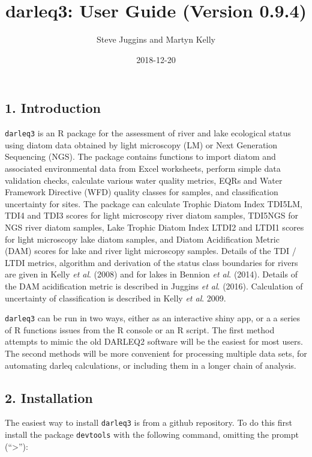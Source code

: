 \documentclass[]{article}
\title{darleq3: User Guide (Version 0.9.4)}
\author{Steve Juggins and Martyn Kelly}
\date{2018-12-20}
\begin{document}
\maketitle

\hypertarget{introduction}{%
\subsection{1. Introduction}\label{introduction}}

\texttt{darleq3} is an R package for the assessment of river and lake
ecological status using diatom data obtained by light microscopy (LM) or
Next Generation Sequencing (NGS). The package contains functions to
import diatom and associated environmental data from Excel worksheets,
perform simple data validation checks, calculate various water quality
metrics, EQRs and Water Framework Directive (WFD) quality classes for
samples, and classification uncertainty for sites. The package can
calculate Trophic Diatom Index TDI5LM, TDI4 and TDI3 scores for light
microscopy river diatom samples, TDI5NGS for NGS river diatom samples,
Lake Trophic Diatom Index LTDI2 and LTDI1 scores for light microscopy
lake diatom samples, and Diatom Acidification Metric (DAM) scores for
lake and river light microscopy samples. Details of the TDI / LTDI
metrics, algorithm and derivation of the status class boundaries for
rivers are given in Kelly \emph{et al}. (2008) and for lakes in Bennion
\emph{et al}. (2014). Details of the DAM acidification metric is
described in Juggins \emph{et al}. (2016). Calculation of uncertainty of
classification is described in Kelly \emph{et al}. 2009.

\texttt{darleq3} can be run in two ways, either as an interactive shiny
app, or a a series of R functions issues from the R console or an R
script. The first method attempts to mimic the old DARLEQ2 software will
be the easiest for most users. The second methods will be more
convenient for processing multiple data sets, for automating darleq
calculations, or including them in a longer chain of analysis.

\hypertarget{installation}{%
\subsection{2. Installation}\label{installation}}

The easiest way to install \texttt{darleq3} is from a github repository.
To do this first install the package \texttt{devtools} with the
following command, omitting the prompt (``\textgreater{}''):
\end{document}
